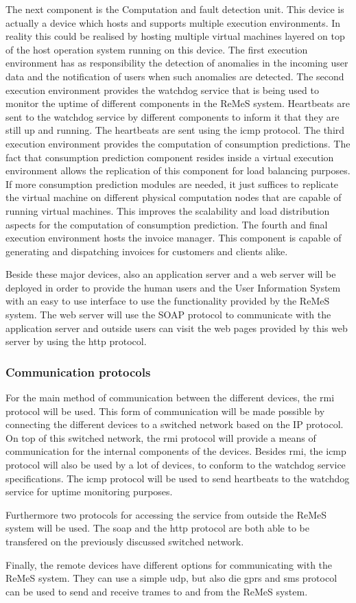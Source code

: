 The next component is the Computation and fault detection unit. This device is actually a device which hosts and supports multiple execution environments.
In reality this could be realised by hosting multiple virtual machines layered on top of the host operation system running on this device.
The first execution environment has as responsibility the detection of anomalies in the incoming user data and the notification
of users when such anomalies are detected. The second execution environment provides the watchdog service that is being used to monitor 
the uptime of different components in the ReMeS system. Heartbeats are sent to the watchdog service by different components to inform it 
that they are still up and running. The heartbeats are sent using the icmp protocol.
The third execution environment provides the computation of consumption predictions. The fact that consumption prediction component resides inside a virtual execution environment allows the replication of this 
component for load balancing purposes. If more consumption prediction modules are needed, it just suffices to replicate the virtual machine on different physical computation nodes that are capable of running virtual machines. This improves the scalability and load distribution aspects for the computation of consumption prediction.
The fourth and final execution environment hosts the invoice manager. This component is capable of generating and dispatching invoices for customers and clients alike. 

Beside these major devices, also an application server and a web server will be deployed in order to provide the human users and the User Information System
with an easy to use interface to use the functionality provided by the ReMeS system.
The web server will use the SOAP protocol to communicate with the application server and outside users can visit the web pages provided
by this web server by using the http protocol.

\subsubsection{Communication protocols}
For the main method of communication between the different devices, the rmi protocol will be used. This form of communication will be made
possible by connecting the different devices to a switched network based on the IP protocol. On top of this switched network, the rmi protocol
will provide a means of communication for the internal components of the devices. Besides rmi, the icmp protocol will also be used by a lot of devices, 
to conform to the watchdog service specifications. The icmp protocol will be used to send heartbeats to the watchdog service for uptime monitoring purposes.

Furthermore two protocols for accessing the service from outside the ReMeS system will be used. The soap and the http protocol are both able to be transfered
on the previously discussed switched network. 

Finally, the remote devices have different options for communicating with the ReMeS system. They can use a simple udp, but also die gprs and sms protocol
can be used to send and receive trames to and from the ReMeS system.  

